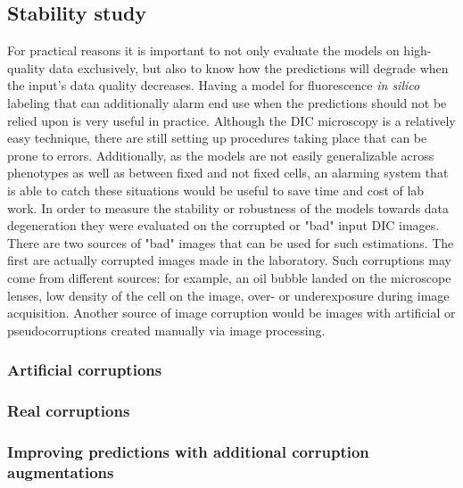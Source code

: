 \subsection{Stability study}
    For practical reasons it is important to not only evaluate the models on high-quality data exclusively, but also to know how the predictions will degrade when the input's data quality decreases. Having a model for fluorescence \textit{in silico} labeling that can additionally alarm end use when the predictions should not be relied upon is very useful in practice. Although the DIC microscopy is a relatively easy technique, there are still setting up procedures taking place that can be prone to errors. Additionally, as the models are not easily generalizable across phenotypes as well as between fixed and not fixed cells, an alarming system that is able to catch these situations would be useful to save time and cost of lab work. In order to measure the stability or robustness of the models towards data degeneration they were evaluated on the corrupted or "bad" input DIC images. There are two sources of "bad" images that can be used for such estimations. The first are actually corrupted images made in the laboratory. Such corruptions may come from different sources: for example, an oil bubble landed on the microscope lenses, low density of the cell on the image, over- or underexposure during image acquisition. Another source of image corruption would be images with artificial or pseudocorruptions created manually via image processing. 
    
    \subsubsection{Artificial corruptions}
        
    \subsubsection{Real corruptions}
        \label{section:real-corruptions}
        
    \subsubsection{Improving predictions with additional corruption augmentations}
        \label{section:augments-againts-corruptions}
        
